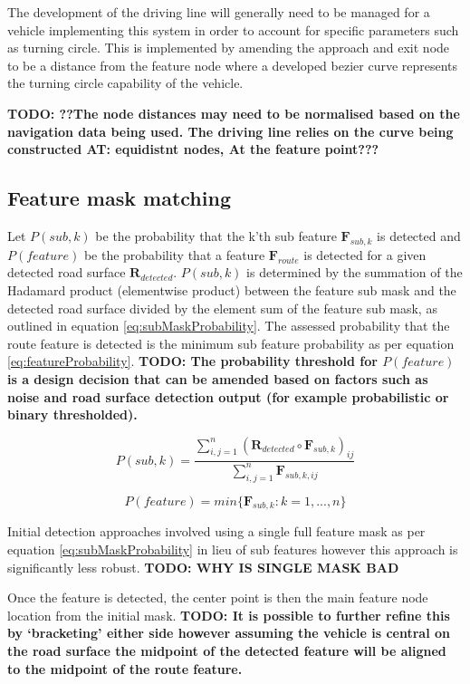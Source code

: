 \documentclass[]{aiaa-tc}%
\begin{document}
The development of the driving line will generally need to be managed for a vehicle implementing this system in order to account for specific parameters such as turning circle. This is implemented by amending the approach and exit node to be a distance from the feature node where a developed bezier curve represents the turning circle capability of the vehicle. 

\textbf{TODO: ??The node distances may need to be normalised based on the navigation data being used. The driving line relies on the curve being constructed AT: equidistnt nodes, At the feature point???}


\subsection{Feature mask matching} 

Let $P(sub,k)$ be the probability that the k'th sub feature $\textbf{F}_{sub,k}$ is detected and $P(feature)$ be the probability that a feature $\textbf{F}_{route}$ is detected for a given detected road surface $\textbf{R}_{detected}$. $P(sub,k)$ is determined by the summation of the Hadamard product (elementwise product) between the feature sub mask and the detected road surface divided by the element sum of the feature sub mask, as outlined in equation \ref{eq:subMaskProbability}. The assessed probability that the route feature is detected is the minimum sub feature probability as per equation \ref{eq:featureProbability}. \textbf{TODO: The probability threshold for $P(feature)$ is a design decision that can be amended based on factors such as noise and road surface detection output (for example probabilistic or binary thresholded).}

\begin{equation}\label{eq:subMaskProbability}
	P(sub,k) = \frac{\sum_{i,j=1}^{n} (\textbf{R}_{detected} \circ \textbf{F}_{sub,k})_{ij}}{\sum_{i,j=1}^{n} \textbf{F}_{sub,k,ij}}
\end{equation}

\begin{equation}\label{eq:featureProbability}
	P(feature) = min\{\textbf{F}_{sub,k}:k=1,...,n\}
\end{equation}

Initial detection approaches involved using a single full feature mask as per equation \ref{eq:subMaskProbability} in lieu of sub features however this approach is significantly less robust. \textbf{TODO: WHY IS SINGLE MASK BAD}

Once the feature is detected, the center point is then the main feature node location from the initial mask. \textbf{TODO: It is possible to further refine this by `bracketing' either side however assuming the vehicle is central on the road surface the midpoint of the detected feature will be aligned to the midpoint of the route feature.}
\end{document}
